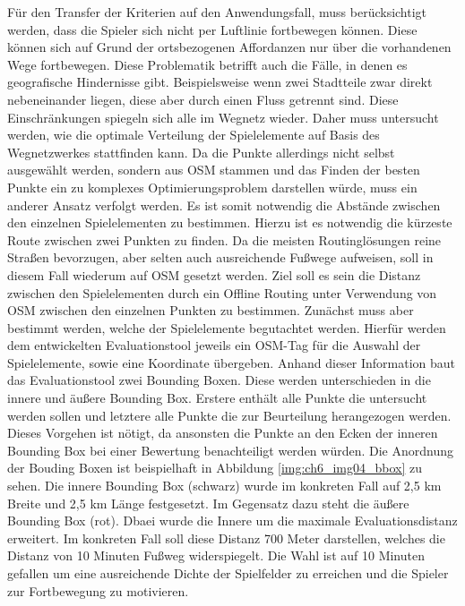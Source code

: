 Für den Transfer der Kriterien auf den Anwendungsfall, muss berücksichtigt werden, dass die Spieler sich nicht per Luftlinie fortbewegen können. Diese können sich auf Grund der ortsbezogenen Affordanzen nur über die vorhandenen Wege fortbewegen. Diese Problematik betrifft auch die Fälle, in denen es geografische Hindernisse gibt. Beispielsweise wenn zwei Stadtteile zwar direkt nebeneinander liegen, diese aber durch einen Fluss getrennt sind. Diese Einschränkungen spiegeln sich alle im Wegnetz wieder. Daher muss untersucht werden, wie die optimale Verteilung der Spielelemente auf Basis des Wegnetzwerkes stattfinden kann. Da die Punkte allerdings nicht selbst ausgewählt werden, sondern aus OSM stammen und das Finden der besten Punkte ein zu komplexes Optimierungsproblem darstellen würde, muss ein anderer Ansatz verfolgt werden. Es ist somit notwendig die Abstände zwischen den einzelnen Spielelementen  zu bestimmen. Hierzu ist es notwendig die kürzeste Route zwischen zwei Punkten zu finden.
Da die meisten Routinglösungen reine Straßen bevorzugen, aber selten auch ausreichende Fußwege aufweisen, soll in diesem Fall wiederum auf OSM gesetzt werden.
Ziel soll es sein die Distanz zwischen den Spielelementen durch ein Offline Routing unter Verwendung von OSM zwischen den einzelnen Punkten zu bestimmen.
Zunächst muss aber bestimmt werden, welche der Spielelemente begutachtet werden. Hierfür werden dem entwickelten Evaluationstool jeweils ein OSM-Tag für die Auswahl der Spielelemente, sowie eine Koordinate übergeben. Anhand dieser Information baut das Evaluationstool zwei Bounding Boxen. Diese werden unterschieden in die innere und äußere Bounding Box. Erstere enthält alle Punkte die untersucht werden sollen und letztere alle Punkte die zur Beurteilung herangezogen werden. Dieses Vorgehen ist nötigt, da ansonsten die Punkte an den Ecken der inneren Bounding Box bei einer Bewertung benachteiligt werden würden.
Die Anordnung der Bouding Boxen ist beispielhaft in Abbildung \ref{img:ch6_img04_bbox} zu sehen.
Die innere Bounding Box (schwarz) wurde im konkreten Fall auf 2,5 km Breite und 2,5 km Länge festgesetzt. Im Gegensatz dazu steht die äußere Bounding Box (rot). Dbaei wurde die Innere um die maximale Evaluationsdistanz erweitert. Im konkreten Fall soll diese Distanz 700 Meter darstellen, welches die Distanz von 10 Minuten Fußweg widerspiegelt. Die Wahl ist auf 10 Minuten gefallen um eine ausreichende Dichte der Spielfelder zu erreichen und die Spieler zur Fortbewegung zu motivieren.


